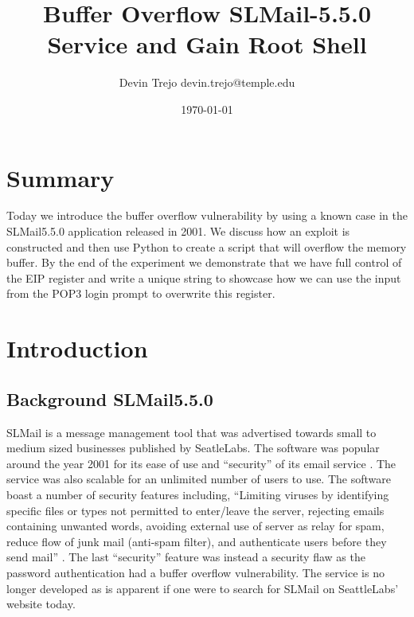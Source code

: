 \documentclass[12pt]{article}
\begin{document}
\title{Buffer Overflow SLMail-5.5.0 Service and Gain Root Shell}
\author{Devin Trejo \tabularnewline devin.trejo@temple.edu}
\date{\today}
\maketitle

\section{Summary}
\label{sect:summary}
Today we introduce the buffer overflow vulnerability by using a known case
in the SLMail5.5.0 application released in 2001. We discuss how an exploit
is constructed and then use Python to create a script that will overflow
the memory buffer. By the end of the experiment we demonstrate that we have
full control of the EIP register and write a unique string to showcase
how we can use the input from the POP3 login prompt to overwrite this 
register. 

\section{Introduction}
\label{sect:intro}
\subsection{Background SLMail5.5.0}
\label{sec:background}
SLMail is a message management tool that was advertised towards small to 
medium sized businesses published by SeatleLabs. The software was popular 
around the year 2001 for its ease of use and ``security'' of its email 
service \cite{SeattleLabs2001}. The service was also scalable for an 
unlimited number of users to use. The software boast a number of security 
features including, ``Limiting viruses by identifying specific files or types 
not permitted to enter/leave the server, rejecting emails containing unwanted 
words, avoiding external use of server as relay for spam, reduce flow of 
junk mail (anti-spam filter), and authenticate users before they send 
mail'' \cite{SeattleLabs2001}. The last ``security'' feature was instead a 
security flaw as the password authentication had a buffer overflow 
vulnerability. The service is no longer developed as is apparent if one
were to search for SLMail on SeattleLabs' website today. 
\end{document}
